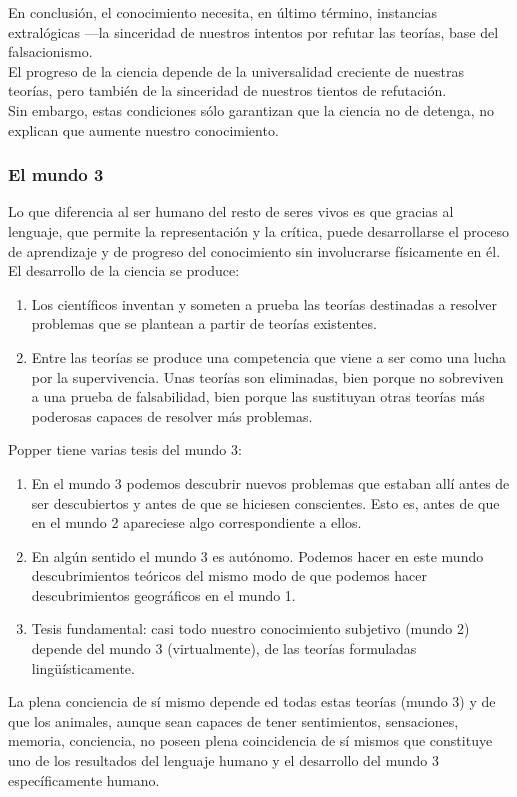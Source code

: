 \documentclass[a4paper, 11pt, twocolumn, spanish]{article}
\begin{document}
En conclusión, el conocimiento necesita, en último término, instancias
extralógicas —la sinceridad de nuestros intentos por refutar las
teorías, base del falsacionismo.\\[0pt]
El progreso de la ciencia depende de la universalidad creciente de
nuestras teorías, pero también de la sinceridad de nuestros tientos de
refutación.\\[0pt]
Sin embargo, estas condiciones sólo garantizan que la ciencia no de
detenga, no explican que aumente nuestro conocimiento.

\subsubsection{El mundo 3}
\label{sec:orga6f75db}
Lo que diferencia al ser humano del resto de seres vivos es que
gracias al lenguaje, que permite la representación y la crítica, puede
desarrollarse el proceso de aprendizaje y de progreso del conocimiento
sin involucrarse físicamente en él. El desarrollo de la ciencia se
produce:
\begin{enumerate}
\item Los científicos inventan y someten a prueba las teorías
destinadas a resolver problemas que se plantean a partir de
teorías existentes.
\item Entre las teorías se produce una competencia que viene a ser como
una lucha por la supervivencia. Unas teorías son eliminadas, bien
porque no sobreviven a una prueba de falsabilidad, bien porque
las sustituyan otras teorías más poderosas capaces de resolver
más problemas.
\end{enumerate}


Popper tiene varias tesis del mundo 3:
\begin{enumerate}
\item En el mundo 3 podemos descubrir nuevos problemas que estaban allí
antes de ser descubiertos y antes de que se hiciesen
conscientes. Esto es, antes de que en el mundo 2 apareciese algo
correspondiente a ellos.
\item En algún sentido el mundo 3 es autónomo. Podemos hacer en este
mundo descubrimientos teóricos del mismo modo de que podemos
hacer descubrimientos geográficos en el mundo 1.
\item Tesis fundamental: casi todo nuestro conocimiento subjetivo
(mundo 2) depende del mundo 3 (virtualmente), de las teorías
formuladas lingüísticamente.
\end{enumerate}

La plena conciencia de sí mismo depende ed todas estas teorías
(mundo 3) y de que los animales, aunque sean capaces de tener
sentimientos, sensaciones, memoria, conciencia, no poseen plena
coincidencia de sí mismos que constituye uno de los resultados del
lenguaje humano y el desarrollo del mundo 3 específicamente humano.\\[0pt]
\end{document}
